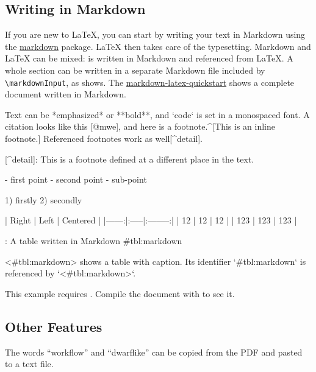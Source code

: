 \subsection{Writing in Markdown}\label{sec:markdown}

\ifluatex
  If you are new to \LaTeX{}, you can start by writing your text in Markdown using the \href{https://ctan.org/pkg/markdown}{markdown} package.
  \LaTeX{} then takes care of the typesetting.
  Markdown and \LaTeX{} can be mixed:
   is written in Markdown and referenced from \LaTeX{}.
  A whole section can be written in a separate Markdown file included by \verb|\markdownInput|, as  shows.
  The \href{https://github.com/latextemplates/markdown-latex-quickstart}{markdown-latex-quickstart} shows a complete document written in Markdown.

  \begin{ltgexample}
  \begin{markdown}
Text can be *emphasized* or **bold**, and `code` is set in a monospaced font.
A citation looks like this [@mwe], and here is a footnote.^[This is an inline footnote.]
Referenced footnotes work as well[^detail].

[^detail]: This is a footnote defined at a different place in the text.

- first point
- second point
  - sub-point

1) firstly
2) secondly

| Right | Left | Centered |
|------:|:-----|:--------:|
|    12 | 12   |    12    |
|   123 | 123  |   123    |

: A table written in Markdown {#tbl:markdown}

<#tbl:markdown> shows a table with caption.
Its identifier `{#tbl:markdown}` is referenced by `<#tbl:markdown>`.
\end{markdown}
  \end{ltgexample}
\else
  This example requires .
  Compile the document with  to see it.
\fi

\subsection{Other Features}

\begin{ltgexample}
The words \enquote{workflow} and \enquote{dwarflike} can be copied from the PDF and pasted to a text file.
\end{ltgexample}

